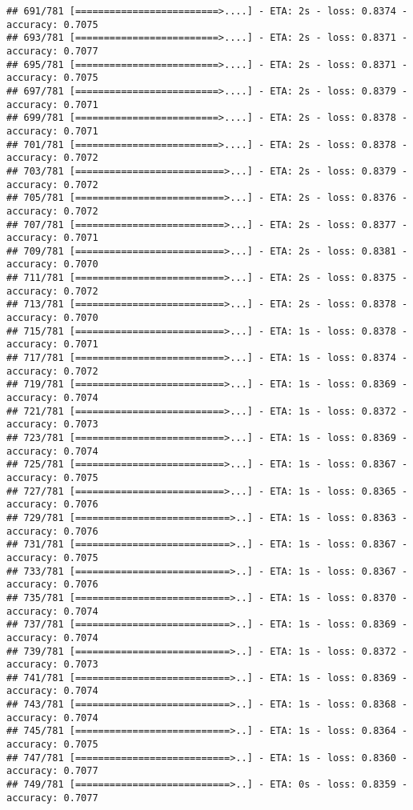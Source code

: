 \documentclass[
]{article}
\begin{document}
\begin{verbatim}
## 691/781 [=========================>....] - ETA: 2s - loss: 0.8374 - accuracy: 0.7075
## 693/781 [=========================>....] - ETA: 2s - loss: 0.8371 - accuracy: 0.7077
## 695/781 [=========================>....] - ETA: 2s - loss: 0.8371 - accuracy: 0.7075
## 697/781 [=========================>....] - ETA: 2s - loss: 0.8379 - accuracy: 0.7071
## 699/781 [=========================>....] - ETA: 2s - loss: 0.8378 - accuracy: 0.7071
## 701/781 [=========================>....] - ETA: 2s - loss: 0.8378 - accuracy: 0.7072
## 703/781 [==========================>...] - ETA: 2s - loss: 0.8379 - accuracy: 0.7072
## 705/781 [==========================>...] - ETA: 2s - loss: 0.8376 - accuracy: 0.7072
## 707/781 [==========================>...] - ETA: 2s - loss: 0.8377 - accuracy: 0.7071
## 709/781 [==========================>...] - ETA: 2s - loss: 0.8381 - accuracy: 0.7070
## 711/781 [==========================>...] - ETA: 2s - loss: 0.8375 - accuracy: 0.7072
## 713/781 [==========================>...] - ETA: 2s - loss: 0.8378 - accuracy: 0.7070
## 715/781 [==========================>...] - ETA: 1s - loss: 0.8378 - accuracy: 0.7071
## 717/781 [==========================>...] - ETA: 1s - loss: 0.8374 - accuracy: 0.7072
## 719/781 [==========================>...] - ETA: 1s - loss: 0.8369 - accuracy: 0.7074
## 721/781 [==========================>...] - ETA: 1s - loss: 0.8372 - accuracy: 0.7073
## 723/781 [==========================>...] - ETA: 1s - loss: 0.8369 - accuracy: 0.7074
## 725/781 [==========================>...] - ETA: 1s - loss: 0.8367 - accuracy: 0.7075
## 727/781 [==========================>...] - ETA: 1s - loss: 0.8365 - accuracy: 0.7076
## 729/781 [===========================>..] - ETA: 1s - loss: 0.8363 - accuracy: 0.7076
## 731/781 [===========================>..] - ETA: 1s - loss: 0.8367 - accuracy: 0.7075
## 733/781 [===========================>..] - ETA: 1s - loss: 0.8367 - accuracy: 0.7076
## 735/781 [===========================>..] - ETA: 1s - loss: 0.8370 - accuracy: 0.7074
## 737/781 [===========================>..] - ETA: 1s - loss: 0.8369 - accuracy: 0.7074
## 739/781 [===========================>..] - ETA: 1s - loss: 0.8372 - accuracy: 0.7073
## 741/781 [===========================>..] - ETA: 1s - loss: 0.8369 - accuracy: 0.7074
## 743/781 [===========================>..] - ETA: 1s - loss: 0.8368 - accuracy: 0.7074
## 745/781 [===========================>..] - ETA: 1s - loss: 0.8364 - accuracy: 0.7075
## 747/781 [===========================>..] - ETA: 1s - loss: 0.8360 - accuracy: 0.7077
## 749/781 [===========================>..] - ETA: 0s - loss: 0.8359 - accuracy: 0.7077

\end{verbatim}
\end{document}
